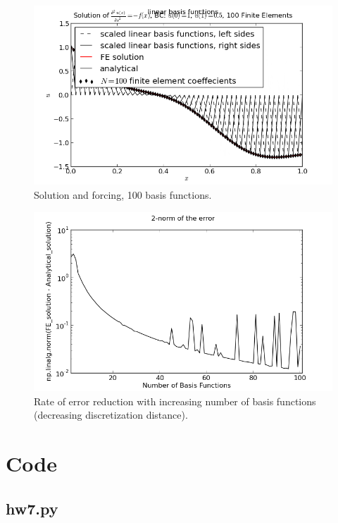\documentclass[10pt]{article}
\newcommand{\code}[2]{
    \subsection*{#1}
    
    \vspace{2em}
}
\begin{document}
\begin{figure}[ht]
    \centering
    \includegraphics[width=\columnwidth,keepaspectratio=true]{./hw7-solution_and_forcing-N100.png}
    \caption{Solution and forcing, 100 basis functions.}
    \label{fig:sf100}
\end{figure}

\begin{figure}[ht]
    \centering
    \includegraphics[width=\columnwidth,keepaspectratio=true]{./hw7-error_rate.png}
    \caption{Rate of error reduction with increasing number of basis functions (decreasing discretization distance).}
    \label{fig:errorrate}
\end{figure}

\clearpage

\section{Code}

\code{hw7.py}{hw7.py}
\end{document}
